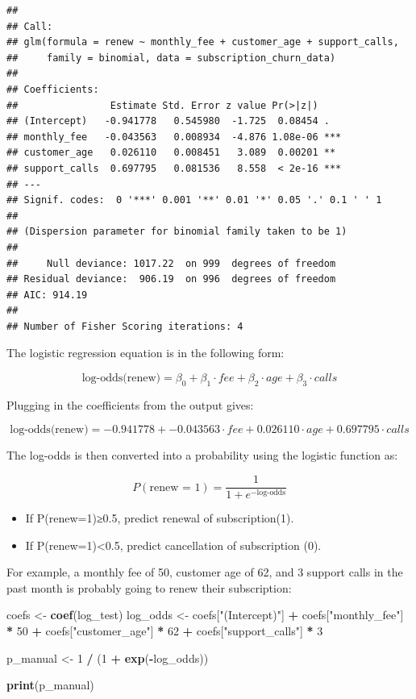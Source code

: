 \documentclass[
]{article}
\newenvironment{Shaded}{\begin{snugshade}}{\end{snugshade}}
\newcommand{\DecValTok}[1]{\textcolor[rgb]{0.00,0.00,0.81}{#1}}
\newcommand{\FunctionTok}[1]{\textcolor[rgb]{0.13,0.29,0.53}{\textbf{#1}}}
\newcommand{\NormalTok}[1]{#1}
\newcommand{\OtherTok}[1]{\textcolor[rgb]{0.56,0.35,0.01}{#1}}
\newcommand{\SpecialCharTok}[1]{\textcolor[rgb]{0.81,0.36,0.00}{\textbf{#1}}}
\newcommand{\StringTok}[1]{\textcolor[rgb]{0.31,0.60,0.02}{#1}}
\begin{document}
\begin{verbatim}
## 
## Call:
## glm(formula = renew ~ monthly_fee + customer_age + support_calls, 
##     family = binomial, data = subscription_churn_data)
## 
## Coefficients:
##                Estimate Std. Error z value Pr(>|z|)    
## (Intercept)   -0.941778   0.545980  -1.725  0.08454 .  
## monthly_fee   -0.043563   0.008934  -4.876 1.08e-06 ***
## customer_age   0.026110   0.008451   3.089  0.00201 ** 
## support_calls  0.697795   0.081536   8.558  < 2e-16 ***
## ---
## Signif. codes:  0 '***' 0.001 '**' 0.01 '*' 0.05 '.' 0.1 ' ' 1
## 
## (Dispersion parameter for binomial family taken to be 1)
## 
##     Null deviance: 1017.22  on 999  degrees of freedom
## Residual deviance:  906.19  on 996  degrees of freedom
## AIC: 914.19
## 
## Number of Fisher Scoring iterations: 4
\end{verbatim}

The logistic regression equation is in the following form:

\[
\text{log-odds(renew)} = \beta_0 + \beta_1 \cdot fee + \beta_2 \cdot age + \beta_3 \cdot calls
\]

Plugging in the coefficients from the output gives:

\[
\text{log-odds(renew)} = -0.941778 + -0.043563 \cdot fee + 0.026110 \cdot age + 0.697795 \cdot calls
\]

The log-odds is then converted into a probability using the logistic
function as:

\[
P(\text{renew = 1}) = \frac{1}{1+e^{-\text{log-odds}}}
\]

\begin{itemize}
\item
  If P(renew=1)≥0.5, predict renewal of subscription(1).
\item
  If P(renew=1)\textless0.5, predict cancellation of subscription (0).
\end{itemize}

For example, a monthly fee of 50, customer age of 62, and 3 support
calls in the past month is probably going to renew their subscription:

\begin{Shaded}
\begin{Highlighting}[]
\NormalTok{coefs }\OtherTok{\textless{}{-}} \FunctionTok{coef}\NormalTok{(log\_test)}
\NormalTok{log\_odds   }\OtherTok{\textless{}{-}}\NormalTok{ coefs[}\StringTok{"(Intercept)"}\NormalTok{] }\SpecialCharTok{+} 
\NormalTok{  coefs[}\StringTok{"monthly\_fee"}\NormalTok{] }\SpecialCharTok{*} \DecValTok{50} \SpecialCharTok{+}
\NormalTok{  coefs[}\StringTok{"customer\_age"}\NormalTok{] }\SpecialCharTok{*} \DecValTok{62} \SpecialCharTok{+}
\NormalTok{  coefs[}\StringTok{"support\_calls"}\NormalTok{] }\SpecialCharTok{*} \DecValTok{3}

\NormalTok{p\_manual }\OtherTok{\textless{}{-}} \DecValTok{1} \SpecialCharTok{/}\NormalTok{ (}\DecValTok{1} \SpecialCharTok{+} \FunctionTok{exp}\NormalTok{(}\SpecialCharTok{{-}}\NormalTok{log\_odds))}

\FunctionTok{print}\NormalTok{(p\_manual)}
\end{Highlighting}
\end{Shaded}
\end{document}
